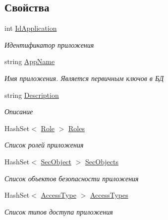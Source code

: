 \subsection*{Свойства}
\begin{DoxyCompactItemize}
\item 
int \hyperlink{class_security_1_1_model_1_1_application_af8652c11a631bfdd48d01d2cc70d89ac}{Id\+Application}
\begin{DoxyCompactList}\small\item\em Идентификатор приложения \end{DoxyCompactList}\item 
string \hyperlink{class_security_1_1_model_1_1_application_a232a5c168d5fdfb6877e8214877dab01}{App\+Name}
\begin{DoxyCompactList}\small\item\em Имя приложения. Является первичным ключов в БД \end{DoxyCompactList}\item 
string \hyperlink{class_security_1_1_model_1_1_application_a76276aaac21beadd87d46555ae824429}{Description}
\begin{DoxyCompactList}\small\item\em Описание \end{DoxyCompactList}\item 
Hash\+Set$<$ \hyperlink{class_security_1_1_model_1_1_role}{Role} $>$ \hyperlink{class_security_1_1_model_1_1_application_a2fba1599162a13e5e27a3fcf4b45bb0d}{Roles}
\begin{DoxyCompactList}\small\item\em Список ролей приложения \end{DoxyCompactList}\item 
Hash\+Set$<$ \hyperlink{class_security_1_1_model_1_1_sec_object}{Sec\+Object} $>$ \hyperlink{class_security_1_1_model_1_1_application_a88559589688c78ab3116cb55fbe730c4}{Sec\+Objects}
\begin{DoxyCompactList}\small\item\em Список объектов безопасности приложения \end{DoxyCompactList}\item 
Hash\+Set$<$ \hyperlink{class_security_1_1_model_1_1_access_type}{Access\+Type} $>$ \hyperlink{class_security_1_1_model_1_1_application_a2d9e137ce8fe15821e51ddb3dd51bebe}{Access\+Types}
\begin{DoxyCompactList}\small\item\em Список типов доступа приложения \end{DoxyCompactList}\end{DoxyCompactItemize}


